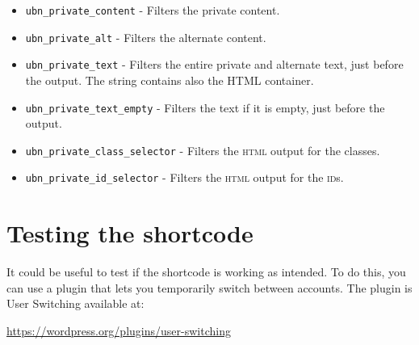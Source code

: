 \documentclass[
	titlepage,
	headinclude,
	abstract=on,
	paper=a4,
	fontsize=11pt,
]{scrartcl}
\begin{document}
\begin{itemize}
 \item \verb+ubn_private_content+ - Filters the private content.
 \item \verb+ubn_private_alt+ - Filters the alternate content.
 \item \verb+ubn_private_text+ - Filters the entire private and alternate text, just before the output. The string contains also the HTML container.
 \item \verb+ubn_private_text_empty+ - Filters the text if it is empty, just before the output.
 \item \verb+ubn_private_class_selector+ - Filters the \textsc{html} output for the classes.
 \item \verb+ubn_private_id_selector+ - Filters the \textsc{html} output for the \textsc{id}s.
\end{itemize}

\section{Testing the shortcode}

It could be useful to test if the shortcode is working as intended. To do this, you can use a plugin that lets you temporarily switch between accounts. The plugin is User Switching available at:
\begin{center}
  \url{https://wordpress.org/plugins/user-switching}
\end{center}
\end{document}
